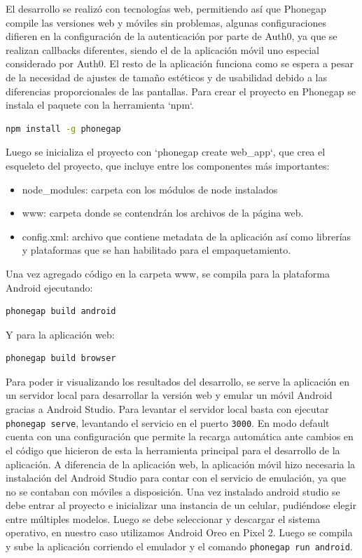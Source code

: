 El desarrollo se realizó con tecnologías web, permitiendo así que Phonegap compile las versiones web y móviles sin problemas, algunas configuraciones difieren en la configuración de la autenticación por parte de Auth0, ya que se realizan callbacks diferentes, siendo el de la aplicación móvil uno especial considerado por Auth0.
El resto de la aplicación funciona como se espera a pesar de la necesidad de ajustes de tamaño estéticos y de usabilidad debido a las diferencias proporcionales de las pantallas.
Para crear el proyecto en Phonegap se instala el paquete con la herramienta `npm`.

\begin{lstlisting}[language=bash]
  npm install -g phonegap
\end{lstlisting}

Luego se inicializa el proyecto con `phonegap create web\_app`, que crea el esqueleto del proyecto, que incluye entre los componentes más importantes: 
\begin{itemize}
  \item node\_modules: carpeta con los módulos de node instalados
  \item www: carpeta donde se contendrán los archivos de la página web.
  \item config.xml: archivo que contiene metadata de la aplicación así como librerías y plataformas que se han habilitado para el empaquetamiento.
\end{itemize}

Una vez agregado código en la carpeta www, se compila para la plataforma Android ejecutando:

\begin{lstlisting}[language=bash]
  phonegap build android
\end{lstlisting}

Y para la aplicación web:

\begin{lstlisting}[language=bash]
  phonegap build browser
\end{lstlisting}

Para poder ir visualizando los resultados del desarrollo, se serve la aplicación en un servidor local para desarrollar la versión web y emular un móvil Android gracias a Android Studio. 
Para levantar el servidor local basta con ejecutar \lstinline[columns=fixed]{phonegap serve}, levantando el servicio en el puerto \lstinline[columns=fixed]{3000}. En modo default cuenta con una configuración que permite la recarga automática ante cambios en el código que hicieron de esta la herramienta principal para el desarrollo de la aplicación.
A diferencia de la aplicación web, la aplicación móvil hizo necesaria la instalación del Android Studio para contar con el servicio de emulación, ya que no se contaban con móviles a disposición. Una vez instalado android studio se debe entrar al proyecto e inicializar una instancia de un celular, pudiéndose elegir entre múltiples modelos. Luego se debe seleccionar y descargar el sistema operativo, en nuestro caso utilizamos Android Oreo en Pixel 2.
Luego se compila y sube la aplicación corriendo el emulador y el comando \lstinline[columns=fixed]{phonegap run android}.


